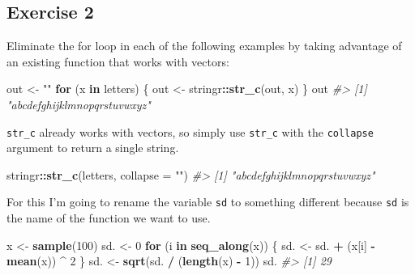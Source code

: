 \documentclass[]{book}
\newenvironment{Shaded}{\begin{snugshade}}{\end{snugshade}}
\newcommand{\CommentTok}[1]{\textcolor[rgb]{0.56,0.35,0.01}{\textit{#1}}}
\newcommand{\ControlFlowTok}[1]{\textcolor[rgb]{0.13,0.29,0.53}{\textbf{#1}}}
\newcommand{\DataTypeTok}[1]{\textcolor[rgb]{0.13,0.29,0.53}{#1}}
\newcommand{\DecValTok}[1]{\textcolor[rgb]{0.00,0.00,0.81}{#1}}
\newcommand{\KeywordTok}[1]{\textcolor[rgb]{0.13,0.29,0.53}{\textbf{#1}}}
\newcommand{\NormalTok}[1]{#1}
\newcommand{\OperatorTok}[1]{\textcolor[rgb]{0.81,0.36,0.00}{\textbf{#1}}}
\newcommand{\StringTok}[1]{\textcolor[rgb]{0.31,0.60,0.02}{#1}}
\theoremstyle{plain}
\theoremstyle{remark}
\theoremstyle{definition}
\theoremstyle{definition}
\theoremstyle{definition}
\theoremstyle{remark}
\begin{document}
\hypertarget{exercise-2-55}{%
\subsection{Exercise 2}\label{exercise-2-55}}

Eliminate the for loop in each of the following examples by taking
advantage of an existing function that works with vectors:

\begin{Shaded}
\begin{Highlighting}[]
\NormalTok{out <-}\StringTok{ ""}
\ControlFlowTok{for}\NormalTok{ (x }\ControlFlowTok{in}\NormalTok{ letters) \{}
\NormalTok{  out <-}\StringTok{ }\NormalTok{stringr}\OperatorTok{::}\KeywordTok{str_c}\NormalTok{(out, x)}
\NormalTok{\}}
\NormalTok{out}
\CommentTok{#> [1] "abcdefghijklmnopqrstuvwxyz"}
\end{Highlighting}
\end{Shaded}

\texttt{str\_c} already works with vectors, so simply use
\texttt{str\_c} with the \texttt{collapse} argument to return a single
string.

\begin{Shaded}
\begin{Highlighting}[]
\NormalTok{stringr}\OperatorTok{::}\KeywordTok{str_c}\NormalTok{(letters, }\DataTypeTok{collapse =} \StringTok{""}\NormalTok{)}
\CommentTok{#> [1] "abcdefghijklmnopqrstuvwxyz"}
\end{Highlighting}
\end{Shaded}

For this I'm going to rename the variable \texttt{sd} to something
different because \texttt{sd} is the name of the function we want to
use.

\begin{Shaded}
\begin{Highlighting}[]
\NormalTok{x <-}\StringTok{ }\KeywordTok{sample}\NormalTok{(}\DecValTok{100}\NormalTok{)}
\NormalTok{sd. <-}\StringTok{ }\DecValTok{0}
\ControlFlowTok{for}\NormalTok{ (i }\ControlFlowTok{in} \KeywordTok{seq_along}\NormalTok{(x)) \{}
\NormalTok{  sd. <-}\StringTok{ }\NormalTok{sd. }\OperatorTok{+}\StringTok{ }\NormalTok{(x[i] }\OperatorTok{-}\StringTok{ }\KeywordTok{mean}\NormalTok{(x)) }\OperatorTok{^}\StringTok{ }\DecValTok{2}
\NormalTok{\}}
\NormalTok{sd. <-}\StringTok{ }\KeywordTok{sqrt}\NormalTok{(sd. }\OperatorTok{/}\StringTok{ }\NormalTok{(}\KeywordTok{length}\NormalTok{(x) }\OperatorTok{-}\StringTok{ }\DecValTok{1}\NormalTok{))}
\NormalTok{sd.}
\CommentTok{#> [1] 29}
\end{Highlighting}
\end{Shaded}
\end{document}

